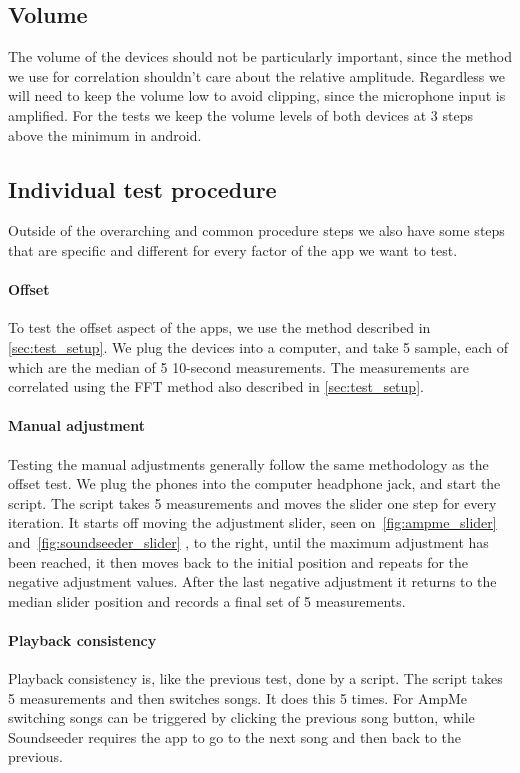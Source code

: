 \subsection{Volume}
The volume of the devices should not be particularly important, since
the method we use for correlation shouldn't care about the relative
amplitude. Regardless we will need to keep the volume low to avoid
clipping, since the microphone input is amplified. For the tests we keep
the volume levels of both devices at 3 steps above the minimum in
android.

\subsection{Individual test procedure}
Outside of the overarching and common procedure steps we also have some
steps that are specific and different for every factor of the app we
want to test.

\paragraph{Offset}
To test the offset aspect of the apps, we use the method described in
\cref{sec:test_setup}. We plug the devices into a computer, and take
5 sample, each of which are the median of 5 10-second measurements. The
measurements are correlated using the \ac{FFT} method also described in
\cref{sec:test_setup}.

\paragraph{Manual adjustment}
Testing the manual adjustments generally follow the same methodology as
the offset test. We plug the phones into the computer headphone jack,
and start the script. The script takes 5 measurements and moves the
slider one step for every iteration. It starts off moving the adjustment
slider, seen on~\vref{fig:ampme_slider} and~\vref{fig:soundseeder_slider}
, to the right, until the maximum adjustment has
been reached, it then moves back to the initial position and repeats for
the negative adjustment values. After the last negative adjustment it
returns to the median slider position and records a final set of
5 measurements.

\paragraph{Playback consistency}
Playback consistency is, like the previous test, done by a script. The
script takes 5 measurements and then switches songs. It does this
5 times. For AmpMe switching songs can be triggered by clicking the
previous song button, while Soundseeder requires the app to go to the
next song and then back to the previous.

